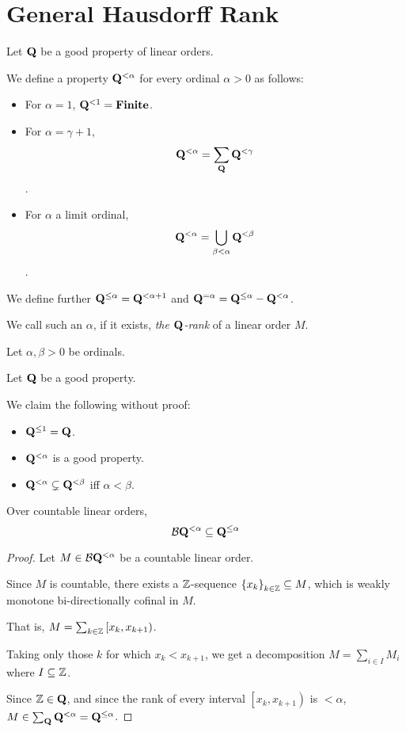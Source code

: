
\section{General Hausdorff Rank}

\begin{definition}
  Let $\mathbf{Q}$ be a good property of linear orders.

  We define a property $\mathbf{Q}^{< \alpha}$
  for every ordinal $\alpha > 0$ as follows:

  \begin{itemize}
    \item For $\alpha = 1$, $\mathbf{Q}^{< 1} = \mathbf{Finite}$.
    \item For $\alpha = \gamma + 1$,
          \[\mathbf{Q}^{< \alpha} = \sum_{\mathbf{Q}}{\mathbf{Q}^{< \gamma}}\].
    \item For $\alpha$ a limit ordinal,
          \[\mathbf{Q}^{< \alpha} = \bigcup_{\beta < \alpha} \mathbf{Q}^{< \beta}\].
  \end{itemize}

  We define further $\mathbf{Q}^{\le \alpha} = \mathbf{Q}^{< \alpha + 1}$
  and $\mathbf{Q}^{= \alpha} = \mathbf{Q}^{\le \alpha} - \mathbf{Q}^{< \alpha}$.
  
  We call such an $\alpha$, if it exists,
  \emph{the $\mathbf{Q}$-rank} of a linear order $M$.
\end{definition}

\begin{observations}
  Let $\alpha, \beta > 0$ be ordinals.

  Let $\mathbf{Q}$ be a good property.

  We claim the following without proof:

  \begin{itemize}
    \item $\mathbf{Q}^{\le 1} = \mathbf{Q}$.
    \item $\mathbf{Q}^{< \alpha}$ is a good property.
    \item $\mathbf{Q}^{< \alpha} \subsetneq \mathbf{Q}^{< \beta}$ iff $\alpha < \beta$.
  \end{itemize}
\end{observations}

\begin{lemma}
  Over countable linear orders,
  \[\mathcal{B}{\mathbf{Q}^{< \alpha}} \subseteq \mathbf{Q}^{\le \alpha}\]
\end{lemma}

\begin{proof}
  Let $M \in \mathcal{B}{\mathbf{Q}^{< \alpha}}$ be a countable linear order.

  Since $M$ is countable, there exists a $\mathbb{Z}$-sequence $\left\{ {x_k} \right\}_{k \in \mathbb{Z}} \subseteq M$,
  which is weakly monotone bi-directionally cofinal in $M$.

  That is, $M = \sum_{k \in \mathbb{Z}} \left[ x_k, x_{k + 1} \right)$.

  Taking only those $k$ for which $x_k < x_{k + 1}$, we get a decomposition
  $M = \sum_{i \in I} M_i$ where $I \subseteq \mathbb{Z}$.

  Since $\mathbb{Z} \in \mathbf{Q}$, and 
  since the rank of every interval $\left[ x_k, x_{k + 1} \right)$ is $< \alpha$,
  $M \in \sum_{\mathbf{Q}}{\mathbf{Q}^{< \alpha}} = \mathbf{Q}^{\le \alpha}$.

\end{proof}


